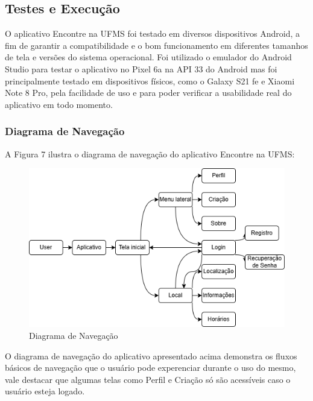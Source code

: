 \subsection{Testes e Execução}

    O aplicativo Encontre na UFMS foi testado em diversos dispositivos Android, a fim de garantir a compatibilidade e o bom funcionamento em diferentes tamanhos de tela e versões do sistema operacional. Foi utilizado o emulador do Android Studio para testar o aplicativo no Pixel 6a na API 33 do Android mas foi principalmente testado em dispositivos físicos, como o Galaxy S21 fe e Xiaomi Note 8 Pro, pela facilidade de uso e para poder verificar a usabilidade real do aplicativo em todo momento.

\subsubsection{Diagrama de Navegação}

    A Figura 7 ilustra o diagrama de navegação do aplicativo Encontre na UFMS:

    \begin{figure}[h]
        \centering
        \includegraphics[width=1\textwidth]{imagens/navegacao.png}
        \caption{\scriptsize Diagrama de Navegação}
        \label{fig:diagrama-navegacao}
    \end{figure}

    O diagrama de navegação do aplicativo apresentado acima demonstra os fluxos básicos de navegação que o usuário pode experenciar
    durante o uso do mesmo, vale destacar que algumas telas como Perfil e Criação só são acessíveis caso o usuário esteja logado.

    \FloatBarrier

